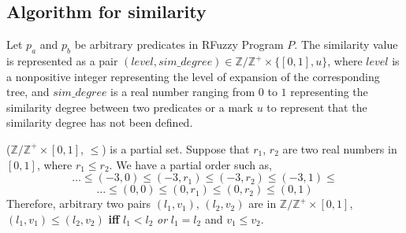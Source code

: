 \subsection{Algorithm for similarity}
\label{sec:Algorithm}
Let $p_a$ and $p_b$ be arbitrary predicates in RFuzzy Program $P$.
The similarity value is represented as a pair $(level,sim\_degree) \in \mathbb{Z}/\mathbb{Z^+} \times \{[0,1],u\}$, where $level$ is a nonpositive integer representing the level of expansion of the corresponding tree, and $sim\_degree$ is a real number ranging from $0$ to $1$ representing the similarity degree between two predicates or a mark $u$ to represent that the similarity degree has not been defined.

($\mathbb{Z}/\mathbb{Z^+} \times [0,1]$, $\leq$) is a partial set. Suppose that $r_1$, $r_2$ are two real numbers in $[0,1]$, where $r_1 \leq r_2$. We have a partial order such as,
\[\dots \leq(-3,0) \leq (-3,r_1) \leq (-3,r_2) \leq (-3,1) \leq \]
\[\dots \leq (0,0) \leq (0,r_1) \leq (0,r_2) \leq (0,1)\]
Therefore, arbitrary two pairs $(l_1,v_1)$, $(l_2,v_2)$ are in $\mathbb{Z}/\mathbb{Z^+} \times [0,1]$, $(l_1,v_1) \leq (l_2,v_2)$ \textbf{iff} $l_1 < l_2$ \textit{or} $l_1 = l_2$ and $v_1 \leq v_2$.
 
